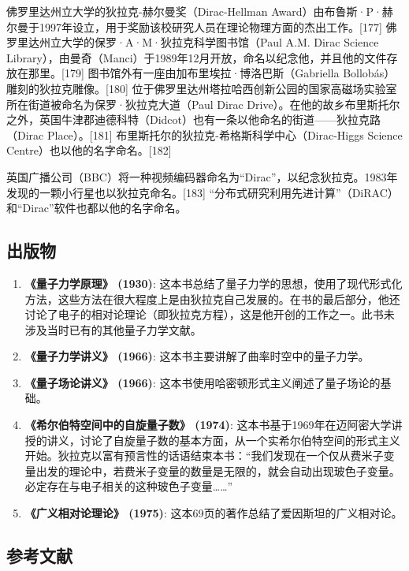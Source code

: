 佛罗里达州立大学的狄拉克-赫尔曼奖（Dirac-Hellman Award）由布鲁斯·P·赫尔曼于1997年设立，用于奖励该校研究人员在理论物理方面的杰出工作。[177] 佛罗里达州立大学的保罗·A·M·狄拉克科学图书馆（Paul A.M. Dirac Science Library），由曼奇（Manci）于1989年12月开放，命名以纪念他，并且他的文件存放在那里。[179] 图书馆外有一座由加布里埃拉·博洛巴斯（Gabriella Bollobás）雕刻的狄拉克雕像。[180] 位于佛罗里达州塔拉哈西创新公园的国家高磁场实验室所在街道被命名为保罗·狄拉克大道（Paul Dirac Drive）。在他的故乡布里斯托尔之外，英国牛津郡迪德科特（Didcot）也有一条以他命名的街道——狄拉克路（Dirac Place）。[181] 布里斯托尔的狄拉克-希格斯科学中心（Dirac-Higgs Science Centre）也以他的名字命名。[182]

英国广播公司（BBC）将一种视频编码器命名为“Dirac”，以纪念狄拉克。1983年发现的一颗小行星也以狄拉克命名。[183] “分布式研究利用先进计算”（DiRAC）和“Dirac”软件也都以他的名字命名。
\subsection{出版物}
\begin{enumerate}
\item \textbf{《量子力学原理》 (1930)}: 这本书总结了量子力学的思想，使用了现代形式化方法，这些方法在很大程度上是由狄拉克自己发展的。在书的最后部分，他还讨论了电子的相对论理论（即狄拉克方程），这是他开创的工作之一。此书未涉及当时已有的其他量子力学文献。
\item \textbf{《量子力学讲义》 (1966)}: 这本书主要讲解了曲率时空中的量子力学。
\item \textbf{《量子场论讲义》 (1966)}: 这本书使用哈密顿形式主义阐述了量子场论的基础。
\item \textbf{《希尔伯特空间中的自旋量子数》 (1974)}: 这本书基于1969年在迈阿密大学讲授的讲义，讨论了自旋量子数的基本方面，从一个实希尔伯特空间的形式主义开始。狄拉克以富有预言性的话语结束本书：“我们发现在一个仅从费米子变量出发的理论中，若费米子变量的数量是无限的，就会自动出现玻色子变量。必定存在与电子相关的这种玻色子变量……”
\item \textbf{《广义相对论理论》 (1975)}: 这本69页的著作总结了爱因斯坦的广义相对论。
\end{enumerate}
\subsection{参考文献}

